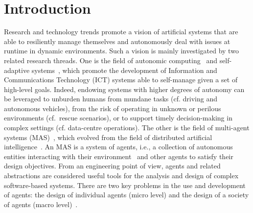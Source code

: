\documentclass[jsan,article,accept,moreauthors,pdftex]{Definitions/mdpi}
\newcommand{\meta}[1]{{\color{blue}{#1}}}
\begin{document}


\section{Introduction}
\label{s:intro}


Research and technology trends 
 promote a vision of artificial systems
 that are able to resiliently manage themselves 
 and autonomously deal with issues at runtime
 in dynamic environments.
%
Such a vision is mainly investigated by two related research threads.
%
One is the field of autonomic computing~\citep{DBLP:journals/computer/KephartC03} and {self-adaptive systems}~\citep{lemos2010sweng-selfadaptive-2ndresearchroadmap},
 which promote the development of Information and Communications Technology (ICT) systems
 able to self-manage given a set of high-level goals.
%
Indeed, endowing systems with higher degrees of autonomy can be leveraged to
 unburden humans from mundane tasks (cf. driving and autonomous vehicles),
 from the risk of operating in unknown or perilous environments
 (\mbox{cf. rescue} scenarios),
 or to support timely decision-making in complex settings
 (cf. data-centre operations).
%
The other is the field of {multi-agent systems (MAS)}~\citep{wooldridge2009mas}, which evolved from the field of {distributed artificial intelligence}~\cite{ferber1999mas-dai}.
%
An MAS is a system of {agents}, i.e., a collection of {autonomous} entities interacting with their {environment}~\citep{DBLP:journals/aamas/WeynsOO07} and other agents to satisfy their design objectives.
%
From an engineering point of view, agents and related abstractions are considered useful tools for the analysis
and design of complex software-based systems.
%
There are two key problems in the use and development of agents: the design of individual agents ({micro level}) and the design of a {society} of agents ({macro level})~\citep{wooldridge2009mas}.
\end{document}
